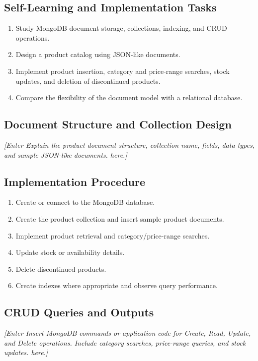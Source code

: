 \documentclass[12pt,a4paper]{report}
\newcommand{\placeholder}[1]{\textit{[Enter #1 here.]}}
\begin{document}
\subsection{Self-Learning and Implementation Tasks}
\begin{enumerate}
    \item Study MongoDB document storage, collections, indexing, and CRUD operations.
    \item Design a product catalog using JSON-like documents.
    \item Implement product insertion, category and price-range searches,
    stock updates, and deletion of discontinued products.
    \item Compare the flexibility of the document model with a relational database.
\end{enumerate}

\subsection{Document Structure and Collection Design}
\placeholder{Explain the product document structure, collection name,
fields, data types, and sample JSON-like documents.}

\subsection{Implementation Procedure}
\begin{enumerate}
    \item Create or connect to the MongoDB database.
    \item Create the product collection and insert sample product documents.
    \item Implement product retrieval and category/price-range searches.
    \item Update stock or availability details.
    \item Delete discontinued products.
    \item Create indexes where appropriate and observe query performance.
\end{enumerate}

\subsection{CRUD Queries and Outputs}
\placeholder{Insert MongoDB commands or application code for Create,
Read, Update, and Delete operations. Include category searches,
price-range queries, and stock updates.}
\end{document}
